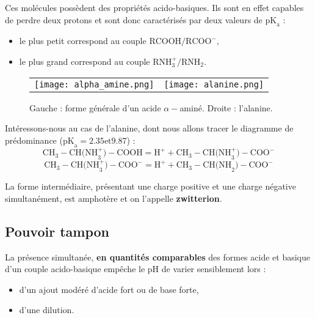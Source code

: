 \documentclass[11pt,a4paper]{report}
\begin{document}
Ces molécules possèdent des propriétés acido-basiques. Ils sont en effet capables de perdre deux protons et sont donc caractérisés par deux valeurs de $\text{pK}_\text{a}$ :
\begin{itemize}
	\item le plus petit correspond au couple $\text{RCOOH}/\text{RCOO}^-$,
	\item le plus grand correspond au couple $\text{RNH}_3^+/\text{RNH}_2$.\\
\end{itemize}

\begin{figure}[h!]
	\begin{center}
		\begin{tabular}{cc}
  		\texttt{[image: alpha\_amine.png]} &
   		\texttt{[image: alanine.png]}\\
	\end{tabular}
	\caption{Gauche : forme générale d'un acide $\alpha-$aminé. Droite : l'alanine.}
	\end{center}
\end{figure}

Intéressons-nous au cas de l'alanine, dont nous allons tracer le diagramme de prédominance ($\text{pK}_\text{a} = 2.35 \text{et} 9.87$) :
\begin{equation}
	\text{CH}_3-\text{CH(NH}_3^+) -\text{COOH} 
	= \text{H}^+ + \text{CH}_3-\text{CH(NH}_3^+)-\text{COO}^-
\end{equation}
\begin{equation}
	\text{CH}_3-\text{CH(NH}_3^+)-\text{COO}^-
	= \text{H}^+ + \text{CH}_3-\text{CH(NH}_2)-\text{COO}^-
\end{equation}

La forme intermédiaire, présentant une charge positive et une charge négative simultanément, est amphotère et on l'appelle \textbf{zwitterion}. 

\subsection{Pouvoir tampon}

La présence simultanée, \textbf{en quantités comparables} des formes acide et basique d'un couple acido-basique empêche le pH de varier sensiblement lors :
\begin{itemize}
	\item d'un ajout modéré d'acide fort ou de base forte,
	\item d'une dilution.
\end{itemize}
\end{document}
